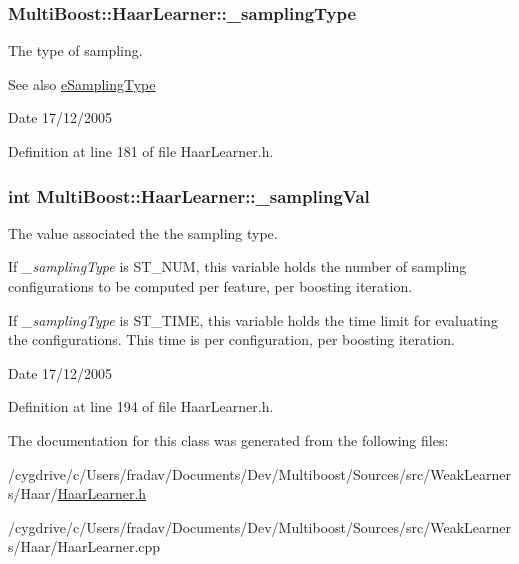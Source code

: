 \hypertarget{classMultiBoost_1_1HaarLearner_adc82d4cecfc91b8163ec07fc627edb27}{
\subsubsection[{\_\-samplingType}]{ {\bf MultiBoost::HaarLearner::\_\-samplingType}}}
\label{classMultiBoost_1_1HaarLearner_adc82d4cecfc91b8163ec07fc627edb27}
The type of sampling. \begin{DoxySeeAlso}{See also}
\hyperlink{classMultiBoost_1_1HaarLearner_adf0e32ac3343991b3bdd302ba8cc0696}{eSamplingType} 
\end{DoxySeeAlso}
\begin{DoxyDate}{Date}
17/12/2005 
\end{DoxyDate}


Definition at line 181 of file HaarLearner.h.

\hypertarget{classMultiBoost_1_1HaarLearner_a2f122e9eaa6c009cc722ff32ad1642c0}{
\subsubsection[{\_\-samplingVal}]{\setlength{\rightskip}{0pt plus 5cm}int {\bf MultiBoost::HaarLearner::\_\-samplingVal}}}
\label{classMultiBoost_1_1HaarLearner_a2f122e9eaa6c009cc722ff32ad1642c0}
The value associated the the sampling type.

If {\itshape \_\-samplingType\/} is ST\_\-NUM, this variable holds the number of sampling configurations to be computed per feature, per boosting iteration.

If {\itshape \_\-samplingType\/} is ST\_\-TIME, this variable holds the time limit for evaluating the configurations. This time is per configuration, per boosting iteration. \begin{DoxyDate}{Date}
17/12/2005 
\end{DoxyDate}


Definition at line 194 of file HaarLearner.h.



The documentation for this class was generated from the following files:\begin{DoxyCompactItemize}
\item 
/cygdrive/c/Users/fradav/Documents/Dev/Multiboost/Sources/src/WeakLearners/Haar/\hyperlink{HaarLearner_8h}{HaarLearner.h}\item 
/cygdrive/c/Users/fradav/Documents/Dev/Multiboost/Sources/src/WeakLearners/Haar/HaarLearner.cpp\end{DoxyCompactItemize}
